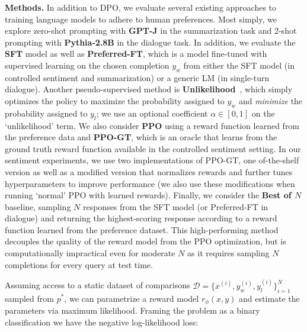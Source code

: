 \textbf{Methods.} In addition to DPO, we evaluate several existing approaches to training language models to adhere to human preferences. Most simply, we explore zero-shot prompting with \textbf{GPT-J} \citep{gpt-j} in the summarization task and 2-shot prompting with \textbf{Pythia-2.8B} \citep{biderman2023pythia} in the dialogue task. In addition, we evaluate the \textbf{SFT} model as well as \textbf{Preferred-FT}, which is a model fine-tuned with supervised learning on the chosen completion $y_w$ from either the SFT model (in controlled sentiment and summarization) or a generic LM (in single-turn dialogue). Another pseudo-supervised method is \textbf{Unlikelihood}~\citep{welleck2019neural}, which simply optimizes the policy to maximize the probability assigned to $y_w$ and \textit{minimize} the probability assigned to $y_l$; we use an optional coefficient $\alpha\in[0,1]$ on the `unlikelihood' term. We also consider \textbf{PPO} \citep{schulman2017proximal} using a reward function learned from the preference data and \textbf{PPO-GT}, which is an oracle that learns from the ground truth reward function available in the controlled sentiment setting. In our sentiment experiments, we use two implementations of PPO-GT, one of-the-shelf version \cite{leandro_von_werra_2023_7790115} as well as a modified version that normalizes rewards and further tunes hyperparameters to improve performance (we also use these modifications when running `normal' PPO with learned rewards). Finally, we consider the \textbf{Best of $N$} baseline, sampling $N$ responses from the SFT model (or Preferred-FT in dialogue) and returning the highest-scoring response according to a reward function learned from the preference dataset. This high-performing method decouples the quality of the reward model from the PPO optimization, but is computationally impractical even for moderate $N$ as it requires sampling $N$ completions for every query at test time.

Assuming access to a static dataset of comparisons $\mathcal{D}=\bigl\{x^{(i)}, y_w^{(i)}, y_l^{(i)}\bigr\}_{i=1}^N$ sampled from $p^*$, we can parametrize a reward model $r_{\phi}(x, y)$ and estimate the parameters via maximum likelihood. Framing the problem as a binary classification we have the negative log-likelihood loss:

